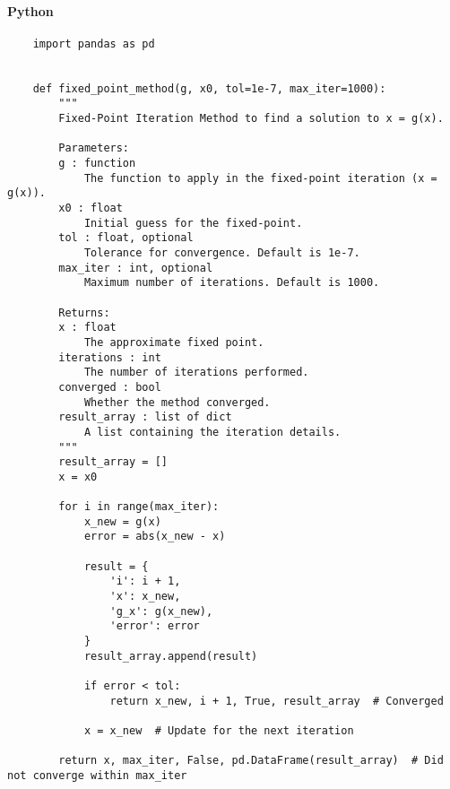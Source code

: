 \documentclass{article}
\begin{document}
    \paragraph{Python}
    \begin{verbatim}
    import pandas as pd


    def fixed_point_method(g, x0, tol=1e-7, max_iter=1000):
        """
        Fixed-Point Iteration Method to find a solution to x = g(x).

        Parameters:
        g : function
            The function to apply in the fixed-point iteration (x = g(x)).
        x0 : float
            Initial guess for the fixed-point.
        tol : float, optional
            Tolerance for convergence. Default is 1e-7.
        max_iter : int, optional
            Maximum number of iterations. Default is 1000.

        Returns:
        x : float
            The approximate fixed point.
        iterations : int
            The number of iterations performed.
        converged : bool
            Whether the method converged.
        result_array : list of dict
            A list containing the iteration details.
        """
        result_array = []
        x = x0

        for i in range(max_iter):
            x_new = g(x)
            error = abs(x_new - x)

            result = {
                'i': i + 1,
                'x': x_new,
                'g_x': g(x_new),
                'error': error
            }
            result_array.append(result)

            if error < tol:
                return x_new, i + 1, True, result_array  # Converged

            x = x_new  # Update for the next iteration

        return x, max_iter, False, pd.DataFrame(result_array)  # Did not converge within max_iter

    \end{verbatim}
\end{document}
